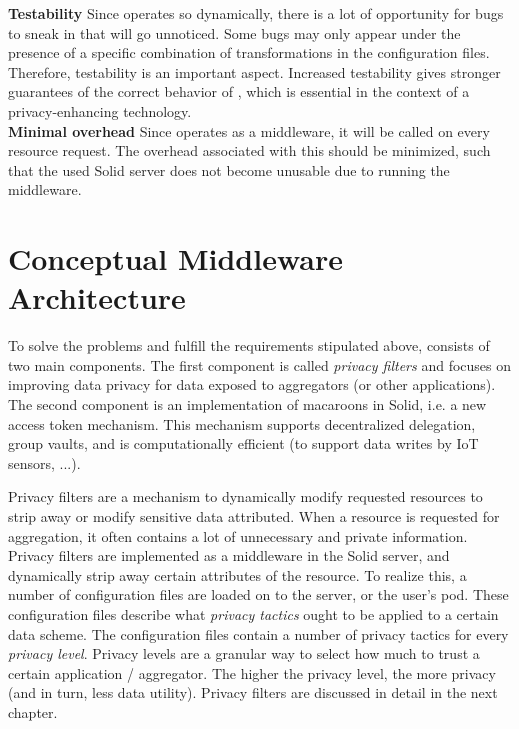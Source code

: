 \noindent \textbf{Testability} Since \middleware{} operates so dynamically, there is a lot of opportunity for bugs to sneak in that will go unnoticed. Some bugs may only appear under the presence of a specific combination of transformations in the configuration files. Therefore, testability is an important aspect. Increased testability gives stronger guarantees of the correct behavior of \middleware{}, which is essential in the context of a privacy-enhancing technology. \\

\noindent \textbf{Minimal overhead} Since \middleware{} operates as a middleware, it will be called on every resource request. The overhead associated with this should be minimized, such that the used Solid server does not become unusable due to running the middleware.

\newpage
\section{Conceptual Middleware Architecture}
To solve the problems and fulfill the requirements stipulated above, \middleware{} consists of two main components. The first component is called \textit{privacy filters} and focuses on improving data privacy for data exposed to aggregators (or other applications). The second component is an implementation of macaroons in Solid, i.e. a new access token mechanism. This mechanism supports decentralized delegation, group vaults, and is computationally efficient (to support data writes by IoT sensors, ...).

Privacy filters are a mechanism to dynamically modify requested resources to strip away or modify sensitive data attributed. When a resource is requested for aggregation, it often contains a lot of unnecessary and private information. Privacy filters are implemented as a middleware in the Solid server, and dynamically strip away certain attributes of the resource. To realize this, a number of configuration files are loaded on to the server, or the user's pod. These configuration files describe what \textit{privacy tactics} ought to be applied to a certain data scheme. The configuration files contain a number of privacy tactics for every \textit{privacy level}. Privacy levels are a granular way to select how much to trust a certain application / aggregator. The higher the privacy level, the more privacy (and in turn, less data utility). Privacy filters are discussed in detail in the next chapter. 

